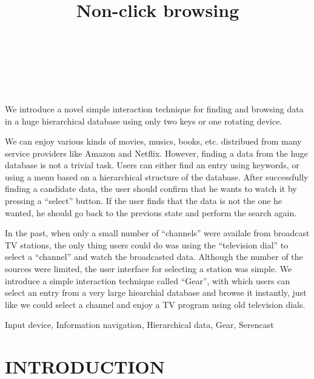 \documentclass{article}
\begin{document}
\title{Non-click browsing}
\author{
\begin{tabular}{l}
\parbox{5.5cm}{
\begin{center}
~ \\
~ \\
~
\end{center}
}
\end{tabular}
}
\maketitle
\abstract

We introduce a novel simple interaction technique for finding and browsing
data in a huge hierarchical database using only two keys or
one rotating device.

We can enjoy various kinds of movies, musics, books,
etc. distribued from many service providers like Amazon and Netflix.
However, 
finding a data from the huge database is not a trivial task. Users can
either find an entry using keywords, or using a menu based
on a hierarchical structure of the database.
After successfully finding a candidate data,
the user should confirm that he wants to watch it by pressing a ``select'' button.
If the user finds that the data is not the one he wanted,
he should go back to the previous state and perform the search again.

In the past, when only a small number of ``channels'' were availale
from broadcast TV stations, the only thing users could do was
using the ``television dial'' to select a ``channel'' and watch the
broadcasted data.
Although the number of the sources were limited,
the user interface for selecting a station was simple.
%
We introduce a simple interaction technique called ``Gear'',
with which users can select an entry from a very large hiearchial database and
browse it instantly, just like we could select a channel and enjoy a TV program
using old television dials.

\keywords Input device, Information navigation, Hierarchical data, Gear, Serencast


\section*{INTRODUCTION}
\end{document}
